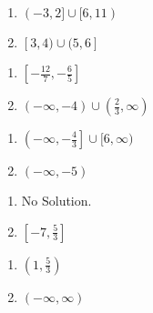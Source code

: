 \documentclass{ximera}
\begin{document}
\begin{multicols}{2}
\begin{enumerate}
\setcounter{enumi}{\value{HW}}

\item $(-3,2] \cup [6,11)$
\item $[3, 4) \cup (5, 6]$


\setcounter{HW}{\value{enumi}}
\end{enumerate}
\end{multicols}

\begin{multicols}{2}
\begin{enumerate}
\setcounter{enumi}{\value{HW}}


\item $\left[-\frac{12}{7}, -\frac{6}{5}\right]$
\item $(-\infty, -4) \cup \left( \frac{2}{3}, \infty\right)$


\setcounter{HW}{\value{enumi}}
\end{enumerate}
\end{multicols}

\begin{multicols}{2}
\begin{enumerate}
\setcounter{enumi}{\value{HW}}

\item $\left(-\infty, -\frac{4}{3} \right] \cup [6, \infty)$

\item   $(-\infty, -5)$

\setcounter{HW}{\value{enumi}}
\end{enumerate}
\end{multicols}

\begin{multicols}{2}
\begin{enumerate}
\setcounter{enumi}{\value{HW}}

 \item   No Solution.

\item    $\left[ -7, \frac{5}{3}\right]$

\setcounter{HW}{\value{enumi}}
\end{enumerate}
\end{multicols}

\begin{multicols}{2}
\begin{enumerate}
\setcounter{enumi}{\value{HW}}

\item  $\left( 1, \frac{5}{3} \right)$

\item   $(-\infty, \infty)$

\setcounter{HW}{\value{enumi}}
\end{enumerate}
\end{multicols}
\end{document}
